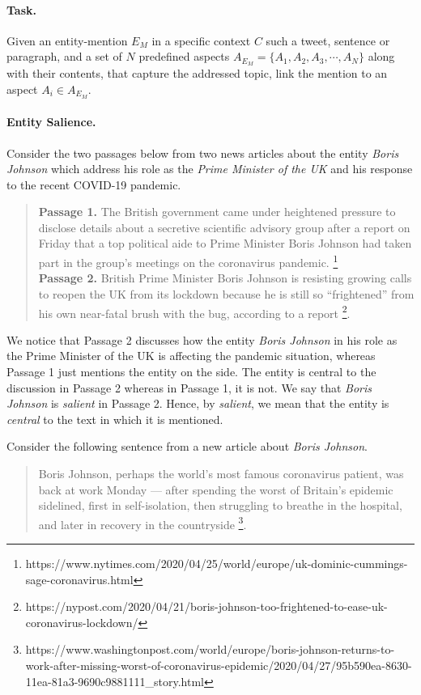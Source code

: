 \documentclass[sigconf,authordraft]{acmart}
\begin{document}
\paragraph{\textbf{Task.}} Given an entity-mention $E_M$ in a specific context $C$ such a tweet, sentence or paragraph, and a set of $N$ predefined aspects $A_{E_M} = \{A_1, A_2, A_3, \cdots, A_N\}$ along with their contents, that capture the addressed topic, link the mention to an aspect $A_i \in A_{E_M}$.

\paragraph{\textbf{Entity Salience.}} 
Consider the two passages below from two news articles about the entity \textit{Boris Johnson} which address his role as the \textit{Prime Minister of the UK} and his response to the recent COVID-19 pandemic.
\begin{quote}
\textbf{Passage 1.} The British government came under heightened pressure to disclose details about a secretive scientific advisory group after a report on Friday that a top political aide to Prime Minister Boris Johnson had taken part in the group’s meetings on the coronavirus pandemic. \footnote{https://www.nytimes.com/2020/04/25/world/europe/uk-dominic-cummings-sage-coronavirus.html}\\
\textbf{Passage 2.} British Prime Minister Boris Johnson is resisting growing calls to reopen the UK from its lockdown because he is still so “frightened” from his own near-fatal brush with the bug, according to a report \footnote{https://nypost.com/2020/04/21/boris-johnson-too-frightened-to-ease-uk-coronavirus-lockdown/}.
\end{quote}
We notice that Passage 2 discusses how the entity \textit{Boris Johnson} in his role as the Prime Minister of the UK is affecting the pandemic situation, whereas Passage 1 just mentions the entity on the side. The entity is central to the discussion in Passage 2 whereas in Passage 1, it is not. We say that \textit{Boris Johnson} is \textit{salient} in Passage 2. Hence, by \textit{salient}, we mean that the entity is \textit{central} to the text in which it is mentioned. 

Consider the following sentence from a new article about \textit{Boris Johnson}.

\begin{quote}
    Boris Johnson, perhaps the world's most famous coronavirus patient, was back at work Monday — after spending the worst of Britain's epidemic sidelined, first in self-isolation, then struggling to breathe in the hospital, and later in recovery in the countryside \footnote{https://www.washingtonpost.com/world/europe/boris-johnson-returns-to-work-after-missing-worst-of-coronavirus-epidemic/2020/04/27/95b590ea-8630-11ea-81a3-9690c9881111_story.html}.
\end{quote}
\end{document}

